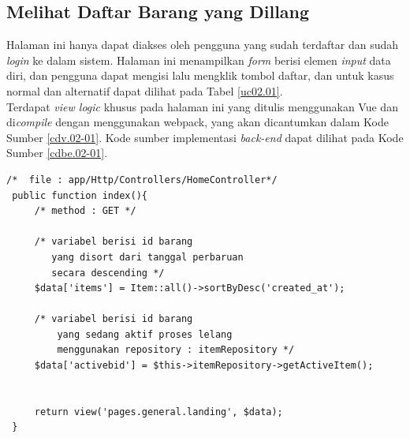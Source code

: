 \newpage
\subsection{Melihat Daftar Barang yang Dillang}
Halaman ini hanya dapat diakses oleh pengguna yang sudah terdaftar dan sudah \textit{login} ke dalam sistem. Halaman ini menampilkan \textit{form} berisi elemen \textit{input} data diri, dan pengguna dapat mengisi lalu mengklik tombol daftar, dan untuk kasus normal dan alternatif dapat dilihat pada Tabel \ref{uc02.01}.\\
\indent Terdapat \textit{view logic} khusus pada halaman ini yang ditulis menggunakan Vue dan di\textit{compile} dengan menggunakan webpack, yang akan dicantumkan dalam Kode Sumber \ref{cdv.02-01}. Kode sumber implementasi \textit{back-end} dapat dilihat pada Kode Sumber \ref{cdbe.02-01}.

\begin{lstlisting}[label=cdbe.02-01,style=php,caption=Implementasi \textit{Back-end} Melihat Daftar Barang]
/*	file : app/Http/Controllers/HomeController*/
 public function index(){
	 /*	method : GET */
	 
	 /*	variabel berisi id barang 
		yang disort dari tanggal perbaruan
		secara descending */
	 $data['items'] = Item::all()->sortByDesc('created_at');
	 
	 /*	variabel berisi id barang 
		 yang sedang aktif proses lelang
		 menggunakan repository : itemRepository */
	 $data['activebid'] = $this->itemRepository->getActiveItem();
	 

	 return view('pages.general.landing', $data);
 }
\end{lstlisting}

